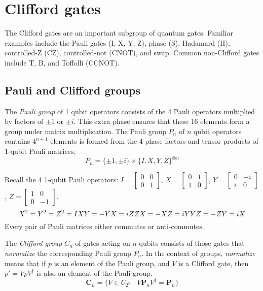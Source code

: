 

\clearpage


\section{Clifford gates}
\label{sec:Clifford}
The Clifford gates are an important subgroup of quantum gates. Familiar examples include the Pauli gates (I, X, Y, Z), phase (S), Hadamard (H), controlled-Z (CZ), controlled-not (CNOT), and swap.  Common non-Clifford gates include T, B, and Toffolli (CCNOT). 

\subsection{Pauli and Clifford groups}

The {\sl Pauli group} of 1 qubit operators  consists of the 4 Pauli operators  multiplied by factors of $\pm 1$ or $\pm i$. This extra phase ensures that these 16 elements form a group under matrix multiplication. The Pauli group $P_n$ of $n$ qubit operators contains $4^{n+1}$ elements is formed from the 4 phase factors and tensor products of 1-qubit Pauli matrices, 
\[
P_n = \{\pm 1, \pm i\} \times \{I, X, Y, Z\}^{\otimes n}
\]

Recall the 4 1-qubit Pauli operators: $I=[\begin{smallmatrix} 0& 0 \\ 0 & 1 \end{smallmatrix}]$,
$X=[\begin{smallmatrix}0 & 1 \\ 1 & 0 \end{smallmatrix}]$, $Y=[\begin{smallmatrix}0 & -i \\ i & 0 \end{smallmatrix}]$, $Z=[\begin{smallmatrix}1 & 0 \\ 0 & -1 \end{smallmatrix}]$.
\[
X^2 = Y^2 = Z^2 = I  \\
XY = -YX = iZ \notag\\
ZX = -XZ = iY \notag\\
YZ = -ZY = iX \notag
\]
Every pair of Pauli matrices either commutes or anti-commutes. 



The {\sl Clifford group}  $C_n$ of gates acting on $n$ qubits consists of those gates that {\sl normalize} the corresponding Pauli group $P_n$. In the context of groups, {\sl normalize} means that if $p$ is an element of the Pauli group, and $V$ is a Clifford gate, then $p' = V p V^\dagger$ is also an element of the Pauli group.
\[
\mathbf{C}_n=\{V\in U_{2^n}\mid V\mathbf{P}_nV^\dagger = \mathbf{P}_n\}
\]


